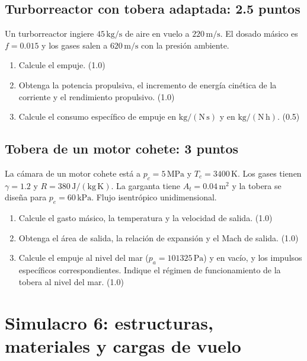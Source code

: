 \section{Turborreactor con tobera adaptada: 2.5 puntos}
Un turborreactor ingiere $45\,\mathrm{kg/s}$ de aire en vuelo a $220\,\mathrm{m/s}$. El dosado másico es $f=0.015$ y los gases salen a $620\,\mathrm{m/s}$ con la presión ambiente.
\begin{enumerate}[label=\alph*)]
\item Calcule el empuje. (1.0)
\item Obtenga la potencia propulsiva, el incremento de energía cinética de la corriente y el rendimiento propulsivo. (1.0)
\item Calcule el consumo específico de empuje en $\mathrm{kg/(N\,s)}$ y en $\mathrm{kg/(N\,h)}$. (0.5)
\end{enumerate}
\section{Tobera de un motor cohete: 3 puntos}
La cámara de un motor cohete está a $p_c=5\,\mathrm{MPa}$ y $T_c=3400\,\mathrm K$. Los gases tienen $\gamma=1.2$ y $R=380\,\mathrm{J/(kg\,K)}$. La garganta tiene $A_t=0.04\,\mathrm{m^2}$ y la tobera se diseña para $p_e=60\,\mathrm{kPa}$. Flujo isentrópico unidimensional.
\begin{enumerate}[label=\alph*)]
\item Calcule el gasto másico, la temperatura y la velocidad de salida. (1.0)
\item Obtenga el área de salida, la relación de expansión y el Mach de salida. (1.0)
\item Calcule el empuje al nivel del mar ($p_a=101325\,\mathrm{Pa}$) y en vacío, y los impulsos específicos correspondientes. Indique el régimen de funcionamiento de la tobera al nivel del mar. (1.0)
\end{enumerate}

\chapter{Simulacro 6: estructuras, materiales y cargas de vuelo}
